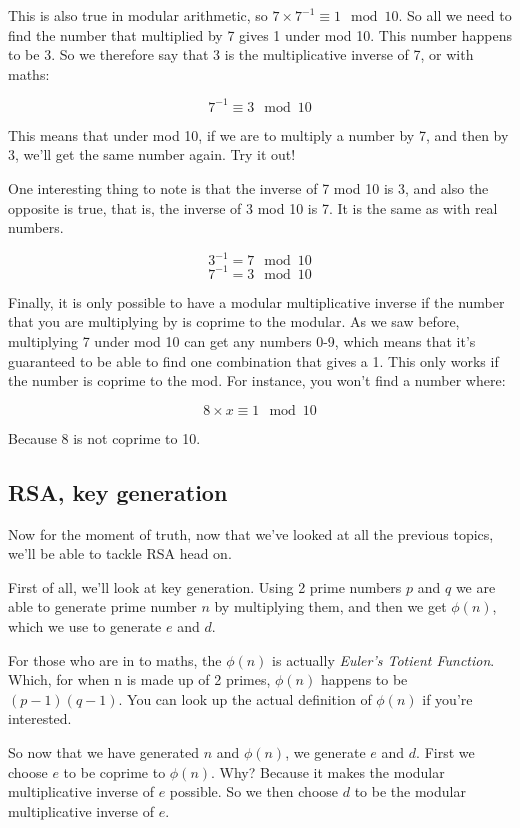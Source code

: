 \documentclass{article}
\begin{document}
  This is also true in modular arithmetic, so $7 \times 7^{-1} \equiv 1 \mod 10$.
  So all we need to find the number that multiplied by 7 gives 1 under mod 10.
  This number happens to be 3. So we therefore say that 3 is the multiplicative
  inverse of 7, or with maths:

  \[ 7^{-1} \equiv 3 \mod 10 \]

  This means that under mod 10, if we are to multiply a number by 7, and then by
  3, we'll get the same number again. Try it out!

  One interesting thing to note is that the inverse of 7 mod 10 is 3, and also
  the opposite is true, that is, the inverse of 3 mod 10 is 7. It is the same
  as with real numbers.

  \[ 3^{-1} = 7 \mod 10 \]
  \[ 7^{-1} = 3 \mod 10\]

  Finally, it is only possible to have a modular multiplicative inverse if the
  number that you are multiplying by is coprime to the modular. As we saw before,
  multiplying 7 under mod 10 can get any numbers 0-9, which means that it's 
  guaranteed to be able to find one combination that gives a 1. This only works
  if the number is coprime to the mod. For instance, you won't find a number where:

  \[ 8 \times x \equiv 1 \mod 10 \]

  Because 8 is not coprime to 10.

  \subsection*{RSA, key generation}
  Now for the moment of truth, now that we've looked at all the previous topics,
  we'll be able to tackle RSA head on.

  First of all, we'll look at key generation. Using 2 prime numbers $p$ and $q$
  we are able to generate prime number $n$ by multiplying them, and then we get
  $\phi(n)$, which we use to generate $e$ and $d$.

  For those who are in to maths, the $\phi(n)$ is actually \textit{Euler's Totient
  Function}. Which, for when n is made up of 2 primes, $\phi(n)$ happens to be
  $(p-1)(q-1)$. You can look up the actual definition of $\phi(n)$ if you're
  interested.

  So now that we have generated $n$ and $\phi(n)$, we generate $e$ and $d$.
  First we choose $e$ to be coprime to $\phi(n)$. Why? Because it makes the
  modular multiplicative inverse of $e$ possible. So we then choose $d$ to be
  the modular multiplicative inverse of $e$.
\end{document}

